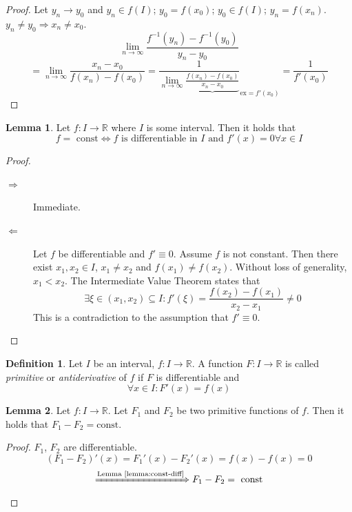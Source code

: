 \documentclass[a4paper,landscape,twocolumn]{article}
\theoremstyle{definition}
\newtheorem{defi}{Definition}
\newtheorem{lemma}{Lemma}
\begin{document}
\begin{proof}
  Let $y_n \to y_0$ and $y_n \in f(I)$; $y_0 = f(x_0)$; $y_0 \in f(I)$; $y_n = f(x_n)$.
  $y_n \neq y_0 \Rightarrow x_n \neq x_0$.
  \[ \lim_{n\to\infty} \frac{f^{-1}(y_n) - f^{-1}(y_0)}{y_n - y_0} \]
  \[
    = \lim_{n\to\infty} \frac{x_n - x_0}{f(x_n) - f(x_0)}
    = \frac{1}{\lim_{n\to\infty} \underbrace{\frac{f(x_n) - f(x_0)}{x_n - x_0}}}_{\text{ex} = f'(x_0)} = \frac{1}{f'(x_0)}
  \]
\end{proof}

\begin{lemma}
  \label{lemma:const-diff}
  Let $f: I \to \mathbb R$ where $I$ is some interval. Then it holds that
  \[ f = \text{ const} \Leftrightarrow f \text{ is differentiable in $I$ and } f'(x) = 0 \forall x \in I \]
\end{lemma}
\begin{proof}
  \begin{description}
    \item[$\Rightarrow$]
      Immediate.
    \item[$\Leftarrow$]
      Let $f$ be differentiable and $f' \equiv 0$.
      Assume $f$ is not constant. Then there exist $x_1, x_2 \in I$, $x_1 \neq x_2$
      and $f(x_1) \neq f(x_2)$. Without loss of generality, $x_1 < x_2$.
      The Intermediate Value Theorem states that
      \[ \exists \xi \in (x_1, x_2) \subseteq I: f'(\xi) = \frac{f(x_2) - f(x_1)}{x_2 - x_1} \neq 0 \]
      This is a contradiction to the assumption that $f' \equiv 0$.
  \end{description}
\end{proof}

\begin{defi}
  Let $I$ be an interval, $f: I \to \mathbb R$.
  A function $F: I \to \mathbb R$ is called \emph{primitive} or \emph{antiderivative} of $f$
  if $F$ is differentiable and
  \[ \forall x \in I: F'(x) = f(x) \]
\end{defi}
\begin{lemma}
  Let $f: I \to \mathbb R$. Let $F_1$ and $F_2$ be two primitive functions of $f$.
  Then it holds that $F_1 - F_2 = \text{const}$.
\end{lemma}
\begin{proof}
  $F_1$, $F_2$ are differentiable.
  \[ (F_1 - F_2)'(x) = F_1'(x) - F_2'(x) = f(x) - f(x) = 0 \]
  \[ \xRightarrow{\text{Lemma~\ref{lemma:const-diff}}} F_1 - F_2 = \text{ const} \]
\end{proof}
\end{document}

